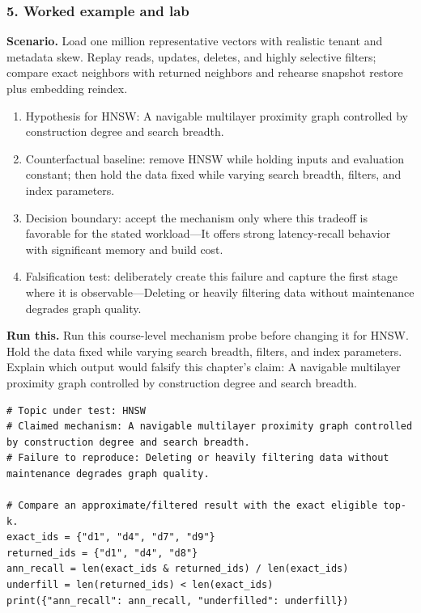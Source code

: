 \subsubsection*{5. Worked example and lab}
\textbf{Scenario.} Load one million representative vectors with realistic tenant and metadata skew. Replay reads, updates, deletes, and highly selective filters; compare exact neighbors with returned neighbors and rehearse snapshot restore plus embedding reindex.
\begin{enumerate}
\item Hypothesis for HNSW: A navigable multilayer proximity graph controlled by construction degree and search breadth.
\item Counterfactual baseline: remove HNSW while holding inputs and evaluation constant; then hold the data fixed while varying search breadth, filters, and index parameters.
\item Decision boundary: accept the mechanism only where this tradeoff is favorable for the stated workload—It offers strong latency-recall behavior with significant memory and build cost.
\item Falsification test: deliberately create this failure and capture the first stage where it is observable—Deleting or heavily filtering data without maintenance degrades graph quality.
\end{enumerate}
\textbf{Run this.} Run this course-level mechanism probe before changing it for HNSW. Hold the data fixed while varying search breadth, filters, and index parameters. Explain which output would falsify this chapter's claim: A navigable multilayer proximity graph controlled by construction degree and search breadth.
\begin{Verbatim}[fontsize=\scriptsize]
# Topic under test: HNSW
# Claimed mechanism: A navigable multilayer proximity graph controlled by construction degree and search breadth.
# Failure to reproduce: Deleting or heavily filtering data without maintenance degrades graph quality.

# Compare an approximate/filtered result with the exact eligible top-k.
exact_ids = {"d1", "d4", "d7", "d9"}
returned_ids = {"d1", "d4", "d8"}
ann_recall = len(exact_ids & returned_ids) / len(exact_ids)
underfill = len(returned_ids) < len(exact_ids)
print({"ann_recall": ann_recall, "underfilled": underfill})
\end{Verbatim}
